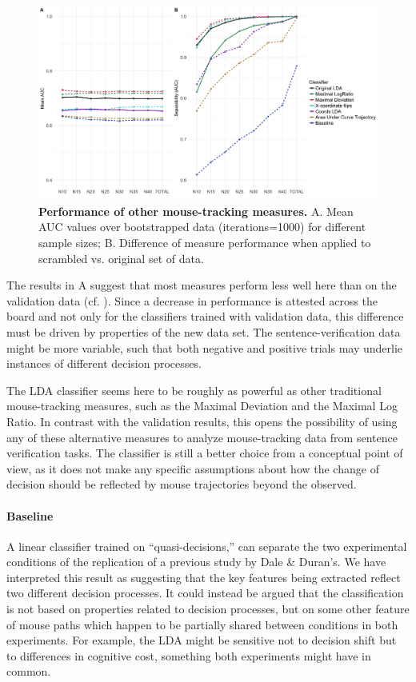 \documentclass{article}
\begin{document}
\begin{figure}
\centering
\includegraphics[width=\textwidth]{auc_permutation_negation_2.png}
\caption{\textbf{Performance of other mouse-tracking measures.} A. Mean AUC values over bootstrapped data (iterations=1000) for different sample sizes;  B. Difference of measure performance when applied to scrambled vs. original set of data.}

\label{fig:permutation_AUC_negation_measures}
\end{figure}

The results in A suggest that most measures perform less well here than on the validation data (cf. ). 
Since a decrease in performance is attested across the board and not only for the classifiers trained with validation data, this difference must be driven by properties of the new data set. The sentence-verification data might be more variable, such that both negative and positive trials may underlie instances of different decision processes. 

The LDA classifier seems here to be roughly as powerful as other traditional mouse-tracking measures, such as the Maximal Deviation and the Maximal Log Ratio. In contrast with the validation results, this opens the possibility of using any of these alternative measures to analyze mouse-tracking data from sentence verification tasks. The classifier is still a better choice from a conceptual point of view, as it does not make any specific assumptions about how the change of decision should be reflected by mouse trajectories beyond the observed.

\paragraph{Baseline}
A linear classifier trained on ``quasi-decisions,'' can separate the two experimental conditions of the replication of a previous study by Dale \& Duran's. We have interpreted this result as suggesting that the key features being extracted reflect two different decision processes. It could instead be argued that the classification is not based on properties related to decision processes, but on some other feature of mouse paths which happen to be partially shared between conditions in both experiments. 
For example, the LDA might  be sensitive not to decision shift but to differences in cognitive cost, something both experiments might have in common.
\end{document}
